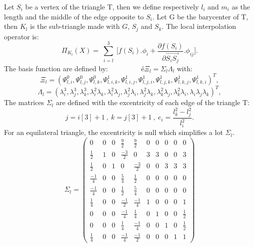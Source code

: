 \documentclass[proc]{edpsmath}
\begin{document}
Let $S_i$ be a vertex of the triangle T, then we define respectively $l_i$ and $m_i$ as the length and the middle of the edge opposite to $S_i$. Let G be the barycenter of T, then $K_l$ is the sub-triangle made with $G$, $S_j$ and $S_k$. The local interpolation operator is:
\begin{equation*}
\Pi_{K_l} (X) = \sum \limits_{\substack{i=l }}^{3}{ [f(S_i).\phi_i +  \frac{\partial f(S_i)}{\partial  \overrightarrow{ S_i S_j } }.\phi_{ij} } ].
\end{equation*} 
The basis function are defined by: $~~~~~~~~~~~~~~~~~~~~é\Xi_l =  \Sigma_l \Lambda_l$
 \noindent with:
\begin{equation*}
  \Xi_l=(\Psi_{l,i}^0, \Psi_{l,j}^0, \Psi_{l,k}^0, \Psi_{l,i,k}^1,\Psi_{l,i,j}^1,\Psi_{l,j,i}^1,\Psi_{l,j,k}^1 ,\Psi_{l,k,j}^1,\Psi_{l,k,i}^1)^T,
\end{equation*} 
\begin{equation*}
  \Lambda_l = ( \lambda_i^3,\lambda_j^3,\lambda_k^3,\lambda_i^2\lambda_k,\lambda_i^2\lambda_j,\lambda_j^2\lambda_i,\lambda_j^2\lambda_k,\lambda_k^2\lambda_j,\lambda_k^2\lambda_i,\lambda_i\lambda_j\lambda_k)^T,
\end{equation*} 
  \noindent The matrices $\Sigma_l$ are defined with the excentricity of each edge of the triangle T: 
\begin{equation*}
j=i[3]+1 ~,~ k=j[3]+1~,~ e_i = \frac{l_k^2 - l_j^2}{l_i^2}.
\end{equation*} 
For an equilateral triangle, the excentricity is null which simplifies a lot $\Sigma_l$.
\begin{equation*}
\Sigma_l = 
\begin{pmatrix}
	0 & 0 & 0 & \frac{9}{2} & \frac{9}{2} & 0 & 0 & 0 & 0 & 0  \\
	\frac{1}{2} & 1 & 0 & \frac{-3}{2} & 0 & 3 & 3 & 0 & 0 & 3 \\
	\frac{1}{2} & 0 & 1 & 0 & \frac{-3}{2} & 0 & 0 & 3 & 3 & 3 \\	 
	\frac{-1}{4} & 0 & 0 & \frac{ 5}{4} & \frac{ 1}{2} & 0 & 0 & 0 & 0 & 0 \\	 
	\frac{-1}{4} & 0 & 0 & \frac{ 1}{2} & \frac{ 5}{4} & 0 & 0 & 0 & 0 & 0 \\
	\frac{ 1}{4} & 0 & 0 & \frac{-1}{2} & \frac{-1}{4} & 1 & 0 & 0 & 0 & 1 \\
	0 & 0 & 0 & \frac{-1}{4} & \frac{ 1}{4} & 0 & 1 & 0 & 0 & \frac{1}{2} \\
	0 & 0 & 0 & \frac{ 1}{4} & \frac{-1}{4} & 0 & 0 & 1 & 0 & \frac{1}{2} \\
	\frac{1}{4} & 0 & 0 & \frac{-1}{4} & \frac{-1}{2} & 0 & 0 & 0 & 1 & 1 
\end{pmatrix}
\end{equation*} 
\end{document}
